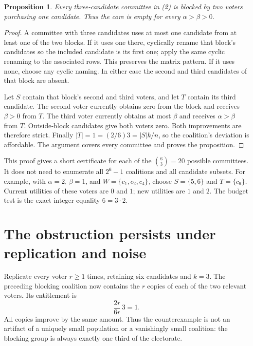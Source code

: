 \documentclass[11pt]{article}
\newtheorem{proposition}{Proposition}
\begin{document}
\begin{proposition}
Every three-candidate committee in (2) is blocked by two voters purchasing
one candidate. Thus the core is empty for every $\alpha>\beta>0$.
\end{proposition}
\begin{proof}
A committee with three candidates uses at most one candidate from at
least one of the two blocks. If it uses one there, cyclically rename that
block's candidates so the included candidate is its first one; apply the
same cyclic renaming to the associated rows. This preserves the matrix
pattern. If it uses none, choose any cyclic naming. In either case the
second and third candidates of that block are absent.

Let $S$ contain that block's second and third voters, and let $T$ contain
its third candidate. The second voter currently obtains zero from the
block and receives $\beta>0$ from $T$. The third voter currently obtains
at most $\beta$ and receives $\alpha>\beta$ from $T$. Outside-block
candidates give both voters zero. Both improvements are therefore strict.
Finally $|T|=1=(2/6)3=|S|k/n$, so the coalition's deviation is affordable.
The argument covers every committee and proves the proposition.
\end{proof}

This proof gives a short certificate for each of the $\binom63=20$
possible committees. It does not need to enumerate all $2^6-1$ coalitions
and all candidate subsets. For example, with $\alpha=2$, $\beta=1$, and
$W=\{c_1,c_2,c_4\}$, choose $S=\{5,6\}$ and $T=\{c_6\}$.
Current utilities of these voters are $0$ and $1$; new utilities are $1$
and $2$. The budget test is the exact integer equality $6=3\cdot2$.

\section*{The obstruction persists under replication and noise}
Replicate every voter $r\geq1$ times, retaining six candidates and $k=3$.
The preceding blocking coalition now contains the $r$ copies of each of
the two relevant voters. Its entitlement is
\[
                        \frac{2r}{6r}\,3=1.
\]
All copies improve by the same amount. Thus the counterexample is not an
artifact of a uniquely small population or a vanishingly small coalition:
the blocking group is always exactly one third of the electorate.
\end{document}
